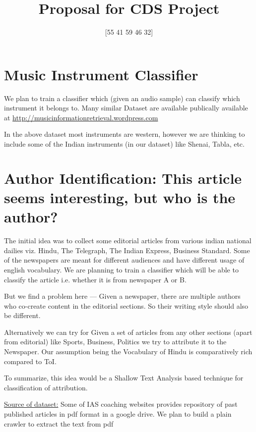 \documentclass[10pt,a4paper]{article}
\title{Proposal for CDS Project}
\author{[55 41 59 46 32]}
\begin{document}
	\maketitle
	
	
	\section{Music Instrument Classifier}
	We plan to train a classifier which (given an audio sample) can classify which instrument it belongs to. 
	Many similar Dataset are available publically available at
	\hyperlink{https://musicinformationretrieval.wordpress.com/2017/01/24/audio-tag-classification-instrument-datasets/}{http://musicinformationretrieval.wordpress.com}
	\normalsize
	
	In the above dataset most instruments are western, however we are thinking to include some of the Indian instruments (in our dataset) like Shenai, Tabla, etc.
	
	
	\section{Author Identification: This article seems interesting, but who is the author?}
	
	The initial idea was to collect some editorial articles from various indian national dailies viz. Hindu, The Telegraph, The Indian Express, Business Standard. Some of the newspapers are meant for different audiences and have different usage of english vocabulary. We are planning to train a classifier which will be able to classify the article i.e. whether it is from newspaper A or B.
	
	But we find a problem here --- Given a newspaper, there are multiple authors who co-create content in the editorial sections. So their writing style should also be different. 
	
	Alternatively we can try for Given a set of articles from any other sections (apart from editorial) like Sports, Business, Politics we try to attribute it to the Newspaper. Our assumption being the Vocabulary of Hindu is comparatively rich compared to ToI. 
	
	To summarize, this idea would be a Shallow Text Analysis based technique for classification of attribution.
	
	
	\underline{Source of dataset:} Some of IAS coaching websites provides repository of past published articles in pdf format in a google drive. We plan to build a plain crawler to extract the text from pdf
	
	
\end{document}
